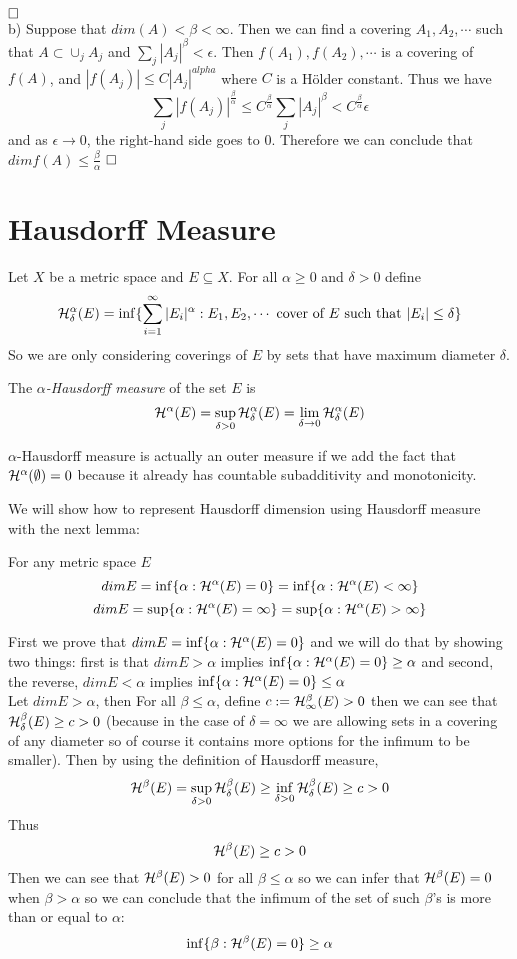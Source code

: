 \documentclass{article}
\begin{document}
$\qed$ \\
b) Suppose that $dim(A)<\beta<\infty$. Then we can find a covering $A_1,A_2,\cdots$ such that $A\subset \cup_j A_j$ and $\sum_j|A_j|^{\beta}<\epsilon$. Then $f(A_1),f(A_2),\cdots$ is a covering of $f(A)$, and $|f(A_j)|\leq C|A_j|^{alpha}$ where $C$ is a H{\"o}lder constant. Thus we have 
$$\sum_j|f(A_j)|^{\frac{\beta}{\alpha}}\leq C^{\frac{\beta}{\alpha}}\sum_j|A_j|^{\beta}<C^{\frac{\beta}{\alpha}}\epsilon $$
and as $\epsilon \rightarrow 0$, the right-hand side goes to $0$. Therefore we can conclude that $dimf(A)\leq\frac{\beta}{\alpha}$
$\qed$

\section{Hausdorff Measure}
Let $X$ be a metric space and $E\subseteq X$. For all $\alpha\geq0$ and $\delta>0$ define 
$$\mathcal{H}_{\delta}^{\alpha}(E)=\inf\{\sum_{i=1}^{\infty}|E_i|^{\alpha}:E_1,E_2,\cdots \text{ cover of } E \text{ such that } |E_i|\leq \delta\} $$
So we are only considering coverings of $E$ by sets that have maximum diameter $\delta$. 

\begin{definition}
The \textit{$\alpha$-Hausdorff measure} of the set $E$ is
$$\mathcal{H}^{\alpha}(E)=\sup_{\delta>0}\mathcal{H}_{\delta}^{\alpha}(E) = \lim_{\delta\rightarrow 0}\mathcal{H}_{\delta}^{\alpha}(E) $$
\end{definition}

$\alpha$-Hausdorff measure is actually an outer measure if we add the fact that $\mathcal{H}^{\alpha}(\emptyset)=0$ because it already has countable subadditivity and monotonicity. 

We will show how to represent Hausdorff dimension using Hausdorff measure with the next lemma:
\begin{lemma}
For any metric space $E$
$$dim E=\inf\{\alpha:\mathcal{H}^{\alpha}(E)=0\}=\inf\{\alpha:\mathcal{H}^{\alpha}(E)<\infty\} $$
$$dim E=\sup\{\alpha:\mathcal{H}^{\alpha}(E)=\infty\}=\sup\{\alpha:\mathcal{H}^{\alpha}(E)>\infty\} $$
\end{lemma}
\proof
First we prove that $dim E=\inf\{\alpha:\mathcal{H}^{\alpha}(E)=0\} $ and we will do that by showing two things: first is that $dim E>\alpha$ implies $\inf\{\alpha:\mathcal{H}^{\alpha}(E)=0\}\geq \alpha$ and second, the reverse, $dim E<\alpha$ implies $\inf\{\alpha:\mathcal{H}^{\alpha}(E)=0\}\leq\alpha$ \\

Let $dim E>\alpha$, then For all $ \beta\leq \alpha$, define $c:=\mathcal{H}_{\infty}^{\beta}(E)>0$ then we can see that $\mathcal{H}_{\delta}^{\beta}(E)\geq c > 0$ (because in the case of $\delta=\infty$ we are allowing sets in a covering of any diameter so of course it contains more options for the infimum to be smaller). Then by using the definition of Hausdorff measure, $$\mathcal{H}^{\beta}(E)=\sup_{\delta>0}\mathcal{H}_{\delta}^{\beta}(E)\geq \inf_{\delta>0}\mathcal{H}_{\delta}^{\beta}(E)\geq c>0$$
Thus
$$\mathcal{H}^{\beta}(E)\geq c>0 $$
Then we can see that $\mathcal{H}^{\beta}(E)>0$ for all $\beta\leq \alpha$ so we can infer that $\mathcal{H}^{\beta}(E)=0$ when $\beta>\alpha$ so we can conclude that the infimum of the set of such $\beta$'s is more than or equal to $\alpha$:
$$\inf\{\beta: \mathcal{H}^{\beta}(E)=0\}\geq \alpha $$
\end{document}
